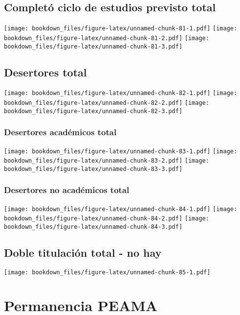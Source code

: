\documentclass[]{article}
\theoremstyle{definition}
\theoremstyle{definition}
\theoremstyle{definition}
\theoremstyle{remark}
\begin{document}
\subsection{Completó ciclo de estudios previsto
total}\label{completo-ciclo-de-estudios-previsto-total}

\texttt{[image: bookdown\_files/figure-latex/unnamed-chunk-81-1.pdf]}
\texttt{[image: bookdown\_files/figure-latex/unnamed-chunk-81-2.pdf]}
\texttt{[image: bookdown\_files/figure-latex/unnamed-chunk-81-3.pdf]}

\subsection{Desertores total}\label{desertores-total}

\texttt{[image: bookdown\_files/figure-latex/unnamed-chunk-82-1.pdf]}
\texttt{[image: bookdown\_files/figure-latex/unnamed-chunk-82-2.pdf]}
\texttt{[image: bookdown\_files/figure-latex/unnamed-chunk-82-3.pdf]}

\subsubsection{Desertores académicos
total}\label{desertores-academicos-total}

\texttt{[image: bookdown\_files/figure-latex/unnamed-chunk-83-1.pdf]}
\texttt{[image: bookdown\_files/figure-latex/unnamed-chunk-83-2.pdf]}
\texttt{[image: bookdown\_files/figure-latex/unnamed-chunk-83-3.pdf]}

\subsubsection{Desertores no académicos
total}\label{desertores-no-academicos-total}

\texttt{[image: bookdown\_files/figure-latex/unnamed-chunk-84-1.pdf]}
\texttt{[image: bookdown\_files/figure-latex/unnamed-chunk-84-2.pdf]}
\texttt{[image: bookdown\_files/figure-latex/unnamed-chunk-84-3.pdf]}

\subsection{Doble titulación total - no
hay}\label{doble-titulacion-total---no-hay}

\texttt{[image: bookdown\_files/figure-latex/unnamed-chunk-85-1.pdf]}

\section{Permanencia PEAMA}\label{permanencia-peama}
\end{document}
